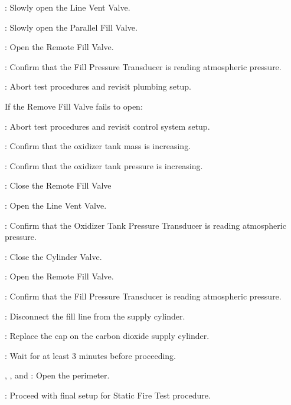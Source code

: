 \begin{checklist}
\begin{checklist}[label=$\bullet$]
\begin{checklist}
            \item \primary{}: Slowly open the Line Vent Valve.
            \item \primary{}: Slowly open the Parallel Fill Valve.
            \item \control{}: Open the Remote Fill Valve.
            \item \daq{}: Confirm that the Fill Pressure Transducer is reading atmospheric pressure.
            \item \ops{}: Abort test procedures and revisit plumbing setup.
        \end{checklist}
        \item If the Remove Fill Valve fails to open:
        \begin{checklist}
            \item \ops{}: Abort test procedures and revisit control system setup.
        \end{checklist}
    \end{checklist}
    \item \daq{}: Confirm that the oxidizer tank mass is increasing.
    \item \daq{}: Confirm that the oxidizer tank pressure is increasing.
    \item \control{}: Close the Remote Fill Valve
    \item \control{}: Open the Line Vent Valve.
    \item \daq{}: Confirm that the Oxidizer Tank Pressure Transducer is reading atmospheric pressure.
    \item \primary{}: Close the Cylinder Valve.
    \item \control{}: Open the Remote Fill Valve.
    \item \daq{}: Confirm that the Fill Pressure Transducer is reading atmospheric pressure.
    \item \primary{}: Disconnect the fill line from the supply cylinder.
    \item \primary{}: Replace the cap on the carbon dioxide supply cylinder.
    \item \ops{}: Wait for at least 3 minutes before proceeding.
    \item \peri{}, \perii{}, and \periii{}: Open the perimeter.
    \item \ops{}: Proceed with final setup for Static Fire Test procedure. 
\end{checklist}
\setcounter{checklistnum}{0}
\newpage

